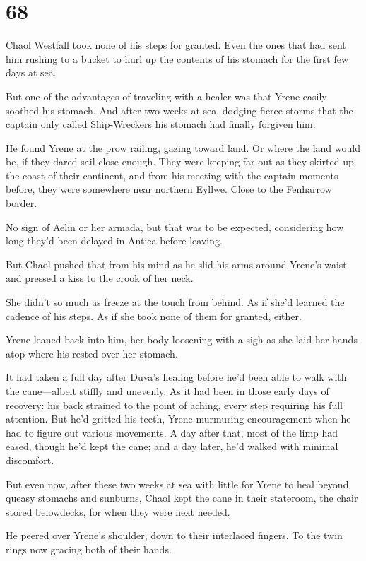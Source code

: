 
\chapter{68}

Chaol Westfall took none of his steps for granted. Even the ones that had sent him rushing to a bucket to hurl up the contents of his stomach for the first few days at sea.

But one of the advantages of traveling with a healer was that Yrene easily soothed his stomach. And after two weeks at sea, dodging fierce storms that the captain only called Ship-Wreckers  his stomach had finally forgiven him.

He found Yrene at the prow railing, gazing toward land. Or where the land would be, if they dared sail close enough. They were keeping far out as they skirted up the coast of their continent, and from his meeting with the captain moments before, they were somewhere near northern Eyllwe. Close to the Fenharrow border.

No sign of Aelin or her armada, but that was to be expected, considering how long they'd been delayed in Antica before leaving.

But Chaol pushed that from his mind as he slid his arms around Yrene's waist and pressed a kiss to the crook of her neck.

She didn't so much as freeze at the touch from behind. As if she'd learned the cadence of his steps. As if she took none of them for granted, either.

Yrene leaned back into him, her body loosening with a sigh as she laid her hands atop where his rested over her stomach.

It had taken a full day after Duva's healing before he'd been able to walk with the cane---albeit stiffly and unevenly. As it had been in those early days of recovery: his back strained to the point of aching, every step requiring his full attention. But he'd gritted his teeth, Yrene murmuring encouragement when he had to figure out various movements. A day after that, most of the limp had eased, though he'd kept the cane; and a day later, he'd walked with minimal discomfort.

But even now, after these two weeks at sea with little for Yrene to heal beyond queasy stomachs and sunburns, Chaol kept the cane in their stateroom, the chair stored belowdecks, for when they were next needed.

He peered over Yrene's shoulder, down to their interlaced fingers. To the twin rings now gracing both of their hands.

